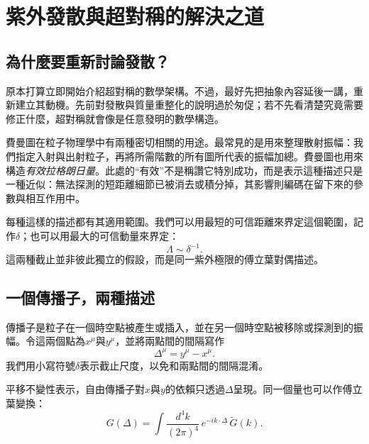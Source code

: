 \chapter{紫外發散與超對稱的解決之道}


\section{為什麼要重新討論發散？}

原本打算立即開始介紹超對稱的數學架構。不過，最好先把抽象內容延後一講，重新建立其動機。先前對發散與質量重整化的說明過於匆促；若不先看清楚究竟需要修正什麼，超對稱就會像是任意發明的數學構造。

費曼圖在粒子物理學中有兩種密切相關的用途。最常見的是用來整理散射振幅：我們指定入射與出射粒子，再將所需階數的所有圖所代表的振幅加總。費曼圖也用來構造\emph{有效拉格朗日量}。此處的``有效''不是稱讚它特別成功，而是表示這種描述只是一種近似：無法探測的短距離細節已被消去或積分掉，其影響則編碼在留下來的參數與相互作用中。

每種這樣的描述都有其適用範圍。我們可以用最短的可信距離來界定這個範圍，記作\(\delta\)；也可以用最大的可信動量來界定：
\begin{equation}
\Lambda\sim \delta^{-1}.
\end{equation}
這兩種截止並非彼此獨立的假設，而是同一紫外極限的傅立葉對偶描述。

\section{一個傳播子，兩種描述}

傳播子是粒子在一個時空點被產生或插入，並在另一個時空點被移除或探測到的振幅。令這兩個點為\(x^\mu\)與\(y^\mu\)，並將兩點間的間隔寫作
\begin{equation}
\Delta^\mu=y^\mu-x^\mu.
\end{equation}
我們用小寫符號\(\delta\)表示截止尺度，以免和兩點間的間隔混淆。

平移不變性表示，自由傳播子對\(x\)與\(y\)的依賴只透過\(\Delta\)呈現。同一個量也可以作傅立葉變換：
\begin{equation}
G(\Delta)
=\int\frac{d^4k}{(2\pi)^4}\,e^{-ik\cdot\Delta}\,\widetilde G(k).
\end{equation}

